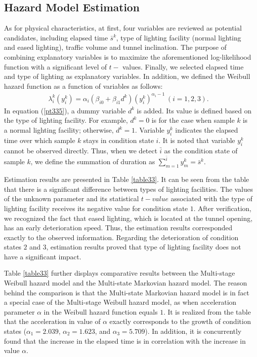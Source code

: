 \subsection{Hazard Model Estimation}
\label{352}
As for physical characteristics, at first, four variables are reviewed as potential candidates,  including elapsed time $\bar{s} ^k$, type of lighting facility (normal lighting and eased lighting), traffic volume and tunnel inclination. The purpose of combining explanatory variables is to maximize the aforementioned log-likelihood function with a significant level of $t-$ values. Finally, we selected elapsed time and type of lighting as explanatory variables. In addition, we defined the Weibull hazard function as a function of variables as follows:
\begin{eqnarray}
\lambda_i^k(y_i^k)=\alpha_{i}(\beta_{i0}+\beta_{i1}d^k) (y_i^k)^{\alpha_{i}-1} ~(i=1,2,3).
\label{pt335}
\end{eqnarray}
In equation (\ref{pt335}), a dummy variable $d^k$ is added. Its value is defined based on the type of lighting facility. For example, $d^k=0$ is for the case when sample $k$ is a normal lighting facility; otherwise, $d^k=1$. Variable $y_i^k$ indicates the elapsed time over which sample $k$ stays in condition state $i$. It is noted that variable $y_i^k$ cannot be observed directly. Thus, when we detect $\bar{i}$ as the condition state of sample $k$, we define the summation of duration as $\sum_{m=1}^{\bar{i}} y_m^k=\bar{s}^k$. 

Estimation results are presented in Table \ref{table33}. It can be seen from the table that there is a significant difference between types of lighting facilities. The values of the unknown parameter and its statistical $t-value$ associated with the type of lighting facility receives its negative value for condition state $1$. After verification, we recognized the fact that eased lighting, which is located at the tunnel opening, has an early deterioration speed. Thus, the estimation results corresponded exactly to the observed information. Regarding the deterioration of condition states $2$ and $3$, estimation results proved that type of lighting facility does not have a significant impact.

Table \ref{table33} further displays comparative results between the Multi-stage Weibull hazard model and the Multi-state Markovian hazard model. The reason behind the comparison is that the Multi-state Markovian hazard model is in fact a special case of the Multi-stage Weibull hazard model, as when acceleration parameter $\alpha$ in the Weibull hazard function equals $1$. It is realized from the table that the acceleration in value of $\alpha$ exactly corresponds to the growth of condition states ($\alpha_1=2.039$, $\alpha_2=1.623$, and $\alpha_3=5.709$). In addition, it is concurrently found that the increase in the elapsed time is in correlation with the increase in value $\alpha$.

